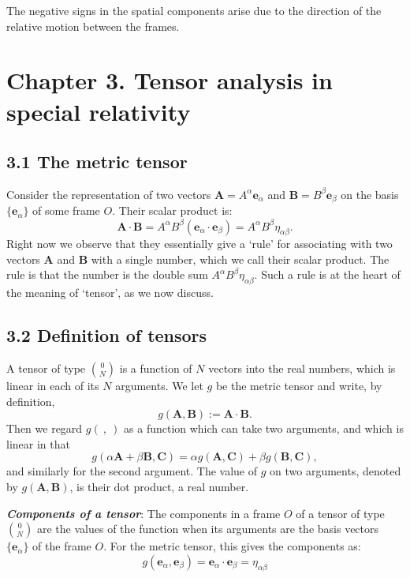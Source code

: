 \documentclass[12pt]{book}
\begin{document}
            The negative signs in the spatial components arise due to the direction of the relative motion between the frames.
           

\section{Chapter 3. Tensor analysis in special relativity}

    \subsection{3.1 The metric tensor}
        Consider the representation of two vectors $\mathbf{A} = A^\alpha \mathbf{e}_\alpha$ and $\mathbf{B} = B^\beta \mathbf{e}_\beta$ on the basis $\{ \mathbf{e}_\alpha \}$ of some frame $O$. Their scalar product is:
        \[
        \mathbf{A} \cdot \mathbf{B} = A^\alpha B^\beta (\mathbf{e}_\alpha \cdot \mathbf{e}_\beta) = A^\alpha B^\beta \eta_{\alpha\beta}. \tag{3.1}
        \]
        Right now we observe that they essentially give a ‘rule’ for associating with two vectors $\mathbf{A}$ and $\mathbf{B}$ with a single number, which we call their scalar product. The rule is that the number is the double sum $A^\alpha B^\beta \eta_{\alpha\beta}$. Such a rule is at the heart of the meaning of ‘tensor’, as we now discuss.

    \subsection{3.2 Definition of tensors}
        A tensor of type $\binom{0}{N}$ is a function of $N$ vectors into the real numbers, which is linear in each of its $N$ arguments.
        We let $g$ be the metric tensor and write, by definition,
        \[
        g(\mathbf{A}, \mathbf{B}) := \mathbf{A} \cdot \mathbf{B}. \tag{3.3}
        \]
        Then we regard $g(\ ,\ )$ as a function which can take two arguments, and which is linear in that
        \[
        g(\alpha \mathbf{A} + \beta \mathbf{B}, \mathbf{C}) = \alpha g(\mathbf{A}, \mathbf{C}) + \beta g(\mathbf{B}, \mathbf{C}), \tag{3.4}
        \]
        and similarly for the second argument. The value of $g$ on two arguments, denoted by $g(\mathbf{A}, \mathbf{B})$, is their dot product, a real number. 

        \textit{\textbf{Components of a tensor}}: The components in a frame \(O\) of a tensor of type $\binom{0}{N}$ are the values of the function when its arguments are the basis vectors \(\{ \mathbf{e}_\alpha \}\) of the frame \(O\). For the metric tensor, this gives the components as:
         \[
         g(\mathbf{e}_\alpha, \mathbf{e}_\beta) = \mathbf{e}_\alpha \cdot \mathbf{e}_\beta = \eta_{\alpha\beta} \tag{3.5}
         \]
\end{document}
